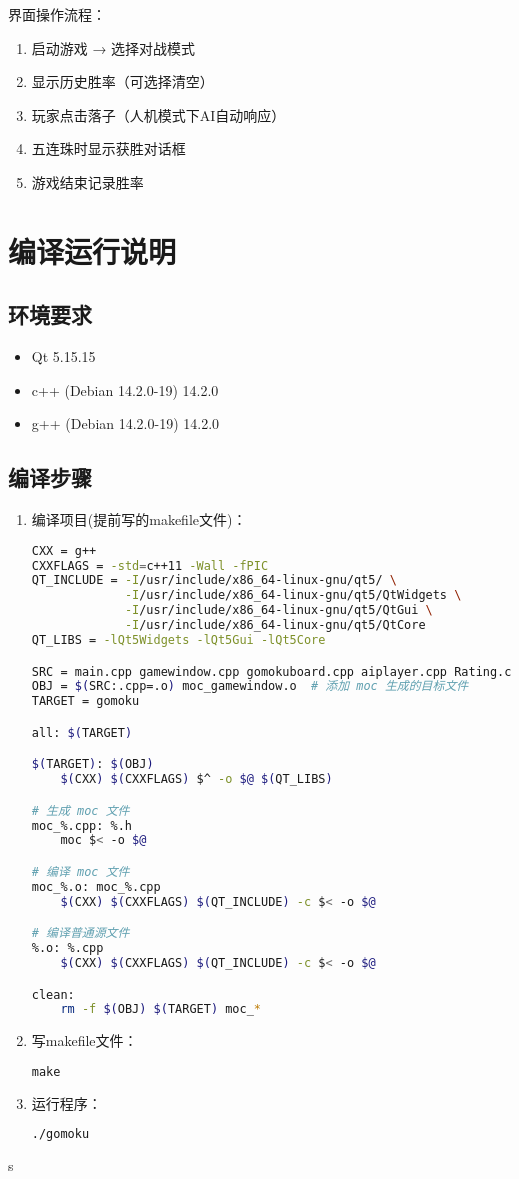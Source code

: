 \documentclass[UTF8]{ctexart}
\begin{document}
界面操作流程：
\begin{enumerate}
    \item 启动游戏 → 选择对战模式
    \item 显示历史胜率（可选择清空）
    \item 玩家点击落子（人机模式下AI自动响应）
    \item 五连珠时显示获胜对话框
    \item 游戏结束记录胜率
\end{enumerate}

\section{编译运行说明}
\subsection{环境要求}
\begin{itemize}
    \item Qt 5.15.15
    \item c++ (Debian 14.2.0-19) 14.2.0
    \item g++ (Debian 14.2.0-19) 14.2.0
\end{itemize}

\subsection{编译步骤}
\begin{enumerate}
    \item 编译项目(提前写的makefile文件)：
\begin{lstlisting}[language=bash]
CXX = g++
CXXFLAGS = -std=c++11 -Wall -fPIC
QT_INCLUDE = -I/usr/include/x86_64-linux-gnu/qt5/ \
             -I/usr/include/x86_64-linux-gnu/qt5/QtWidgets \
             -I/usr/include/x86_64-linux-gnu/qt5/QtGui \
             -I/usr/include/x86_64-linux-gnu/qt5/QtCore
QT_LIBS = -lQt5Widgets -lQt5Gui -lQt5Core

SRC = main.cpp gamewindow.cpp gomokuboard.cpp aiplayer.cpp Rating.cpp
OBJ = $(SRC:.cpp=.o) moc_gamewindow.o  # 添加 moc 生成的目标文件
TARGET = gomoku

all: $(TARGET)

$(TARGET): $(OBJ)
	$(CXX) $(CXXFLAGS) $^ -o $@ $(QT_LIBS)

# 生成 moc 文件
moc_%.cpp: %.h
	moc $< -o $@

# 编译 moc 文件
moc_%.o: moc_%.cpp
	$(CXX) $(CXXFLAGS) $(QT_INCLUDE) -c $< -o $@

# 编译普通源文件
%.o: %.cpp
	$(CXX) $(CXXFLAGS) $(QT_INCLUDE) -c $< -o $@

clean:
	rm -f $(OBJ) $(TARGET) moc_*
\end{lstlisting}
\item 写makefile文件：
\begin{lstlisting}[language=make]
make
\end{lstlisting}
    \item 运行程序：
\begin{lstlisting}[language=bash]
./gomoku
\end{lstlisting}
\end{enumerate}s
\end{document}
